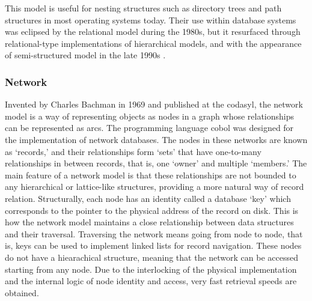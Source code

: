 This model is useful for nesting structures such as directory trees and path structures in most operating systems today. Their use within database systems was eclipsed by the relational model during the 1980s, but it resurfaced through relational-type implementations of hierarchical models, and with the appearance of semi-structured model in the late 1990s .

\subsubsection{Network}
\label{model:network}


Invented by Charles Bachman in 1969 and published at the \gls{codasyl}, the network model is a way of representing objects as nodes in a graph whose relationships can be represented as arcs. The programming language \gls{cobol} was designed for the implementation of network databases. The nodes in these networks are known as `records,' and their relationships form `sets' that have one-to-many relationships in between records, that is, one `owner' and multiple `members.' The main feature of a network model is that these relationships are not bounded to any hierarchical or lattice-like structures, providing a more natural way of record relation. Structurally, each node has an identity called a database `key' which corresponds to the pointer to the physical address of the record on disk. This is how the network model maintains a close relationship between data structures and their traversal. Traversing the network means going from node to node, that is, keys can be used to implement linked lists for record navigation. These nodes do not have a hiearachical structure, meaning that the network can be accessed starting from any node. Due to the interlocking of the physical implementation and the internal logic of node identity and access, very fast retrieval speeds are obtained.


